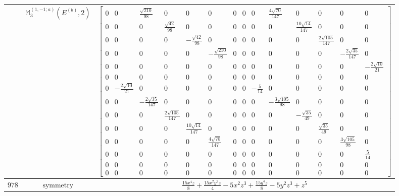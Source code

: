 \documentclass[fleqn,8pt,landscape]{jsarticle}
\begin{document}
\begin{longtable}{ccc}
$  $ & $ \mathbb{M}_{3}^{(1,-1;a)}(E^{(b)},2) $ & $ \begin{bmatrix} 0 & 0 & \frac{\sqrt{210}}{98} & 0 & 0 & 0 & 0 & 0 & 0 & \frac{4 \sqrt{70}}{147} & 0 & 0 & 0 & 0 \\ 0 & 0 & 0 & \frac{\sqrt{42}}{98} & 0 & 0 & 0 & 0 & 0 & 0 & \frac{10 \sqrt{14}}{147} & 0 & 0 & 0 \\ 0 & 0 & 0 & 0 & - \frac{\sqrt{42}}{98} & 0 & 0 & 0 & 0 & 0 & 0 & \frac{2 \sqrt{105}}{147} & 0 & 0 \\ 0 & 0 & 0 & 0 & 0 & - \frac{\sqrt{210}}{98} & 0 & 0 & 0 & 0 & 0 & 0 & - \frac{2 \sqrt{35}}{147} & 0 \\ 0 & 0 & 0 & 0 & 0 & 0 & 0 & 0 & 0 & 0 & 0 & 0 & 0 & - \frac{2 \sqrt{10}}{21} \\ 0 & 0 & 0 & 0 & 0 & 0 & 0 & 0 & 0 & 0 & 0 & 0 & 0 & 0 \\ 0 & - \frac{2 \sqrt{10}}{21} & 0 & 0 & 0 & 0 & 0 & 0 & - \frac{5}{14} & 0 & 0 & 0 & 0 & 0 \\ 0 & 0 & - \frac{2 \sqrt{35}}{147} & 0 & 0 & 0 & 0 & 0 & 0 & - \frac{3 \sqrt{105}}{98} & 0 & 0 & 0 & 0 \\ 0 & 0 & 0 & \frac{2 \sqrt{105}}{147} & 0 & 0 & 0 & 0 & 0 & 0 & - \frac{\sqrt{35}}{49} & 0 & 0 & 0 \\ 0 & 0 & 0 & 0 & \frac{10 \sqrt{14}}{147} & 0 & 0 & 0 & 0 & 0 & 0 & \frac{\sqrt{35}}{49} & 0 & 0 \\ 0 & 0 & 0 & 0 & 0 & \frac{4 \sqrt{70}}{147} & 0 & 0 & 0 & 0 & 0 & 0 & \frac{3 \sqrt{105}}{98} & 0 \\ 0 & 0 & 0 & 0 & 0 & 0 & 0 & 0 & 0 & 0 & 0 & 0 & 0 & \frac{5}{14} \\ 0 & 0 & 0 & 0 & 0 & 0 & 0 & 0 & 0 & 0 & 0 & 0 & 0 & 0 \\ 0 & 0 & 0 & 0 & 0 & 0 & 0 & 0 & 0 & 0 & 0 & 0 & 0 & 0 \end{bmatrix} $ \\ \hline
$ 978 $ & $ \text{symmetry} $ & $ \frac{15 x^{4} z}{8} + \frac{15 x^{2} y^{2} z}{4} - 5 x^{2} z^{3} + \frac{15 y^{4} z}{8} - 5 y^{2} z^{3} + z^{5} $ \\

\end{longtable}
\end{document}
